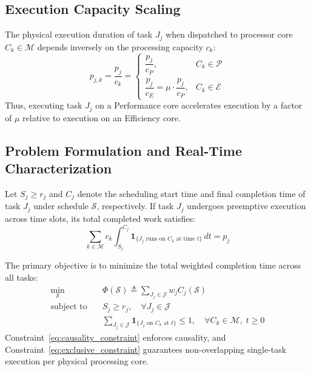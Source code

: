 \documentclass[conference]{IEEEtran}
\begin{document}
\subsection{Execution Capacity Scaling}
The physical execution duration of task $J_j$ when dispatched to processor core $C_k \in \mathcal{M}$ depends inversely on the processing capacity $c_k$:
\begin{equation}
p_{j,k} = \frac{p_j}{c_k} = \begin{cases} 
\dfrac{p_j}{c_P}, & C_k \in \mathcal{P} \\[8pt] 
\dfrac{p_j}{c_E} = \mu \cdot \dfrac{p_j}{c_P}, & C_k \in \mathcal{E} 
\end{cases}
\end{equation}
Thus, executing task $J_j$ on a Performance core accelerates execution by a factor of $\mu$ relative to execution on an Efficiency core.

\subsection{Problem Formulation and Real-Time Characterization}
Let $S_j \ge r_j$ and $C_j$ denote the scheduling start time and final completion time of task $J_j$ under schedule $\mathcal{S}$, respectively. If task $J_j$ undergoes preemptive execution across time slots, its total completed work satisfies:
\begin{equation}
\sum_{k \in \mathcal{M}} c_k \int_{S_j}^{C_j} \mathbf{1}_{\{J_j \text{ runs on } C_k \text{ at time } t\}} \, dt = p_j
\end{equation}

The primary objective is to minimize the total weighted completion time across all tasks:
\begin{align}
\min_{\mathcal{S}} \quad & \Phi(\mathcal{S}) \triangleq \sum_{J_j \in \mathcal{J}} w_j C_j(\mathcal{S}) \label{eq:obj} \\
\text{subject to} \quad & S_j \ge r_j, \quad \forall J_j \in \mathcal{J} \label{eq:causality_constraint} \\
& \sum_{J_j \in \mathcal{J}} \mathbf{1}_{\{J_j \text{ on } C_k \text{ at } t\}} \le 1, \quad \forall C_k \in \mathcal{M}, \; t \ge 0 \label{eq:exclusive_constraint}
\end{align}
Constraint~\eqref{eq:causality_constraint} enforces causality, and Constraint~\eqref{eq:exclusive_constraint} guarantees non-overlapping single-task execution per physical processing core.
\end{document}

